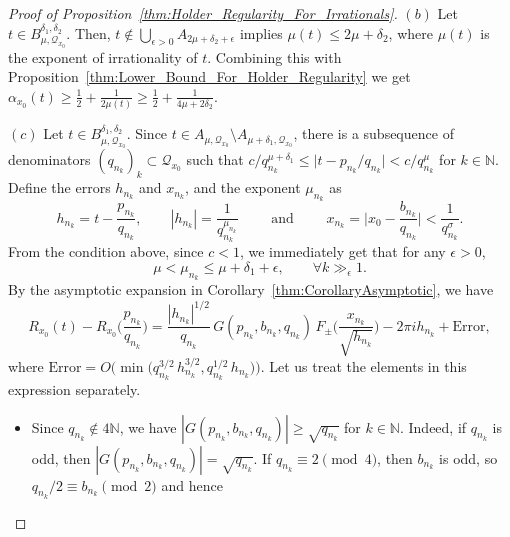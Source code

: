\documentclass[11pt,reqno]{amsart}
\theoremstyle{definition}
\begin{document}
\begin{proof}[Proof of Proposition~\ref{thm:Holder_Regularity_For_Irrationals}]
	


$(b)$ Let $t \in B^{\delta_1, \delta_2}_{\mu, \mathcal Q_{x_0}}$. 
Then,
$t \notin \bigcup_{\epsilon > 0} A_{2\mu + \delta_2 + \epsilon}$ implies $\mu(t) \leq 2\mu + \delta_2$, 
where $\mu(t)$ is the exponent of irrationality of $t$. 
Combining this with Proposition~\ref{thm:Lower_Bound_For_Holder_Regularity} we get
$ \alpha_{x_0}(t) \geq \frac12 + \frac{1}{2\mu(t)} \geq \frac12 + \frac{1}{4\mu + 2\delta_2}$.



$(c)$ Let $t \in B^{\delta_1, \delta_2}_{\mu, \mathcal Q_{x_0}}$. 
Since $t \in  A_{\mu, \mathcal Q_{x_0}} \setminus A_{\mu + \delta_1, \mathcal Q_{x_0} } $, 
there is a subsequence of denominators $(q_{n_k})_k  \subset \mathcal Q_{x_0}$ 
such that $c/q_{n_k}^{\mu + \delta_1} \leq \big|  t - p_{n_k}/q_{n_k} \big| < c/q_{n_k}^\mu$ for $k \in \mathbb N$. 
Define the errors $h_{n_k}$ and $x_{n_k}$, and the exponent $\mu_{n_k}$ as
\begin{equation}\label{eq:Errors_Irrationals}
h_{n_k} =  t - \frac{p_{n_k}}{q_{n_k}}, 
\qquad 
|h_{n_k}| 
= \frac{1}{q_{n_k}^{\mu_{n_k}}}
\qquad  \text{ and } \qquad 
x_{n_k} = \Big| x_0 - \frac{b_{n_k}}{q_{n_k}} \Big| < \frac{1}{q_{n_k}^{\sigma}}. 
\end{equation}
From the condition above, since $c < 1$, 
we immediately get that for any $\epsilon >0$,
\begin{equation}\label{eq:s_n_k_For_Large_k}
\mu < \mu_{n_k} \leq \mu + \delta_1 + \epsilon, \qquad \forall k \gg_\epsilon 1. 
\end{equation}
By the asymptotic expansion in Corollary~\ref{thm:CorollaryAsymptotic}, we have 
\begin{equation}\label{eq:Main_And_Error_Irrationals}
R_{x_0}(t) - R_{x_0}\Big( \frac{p_{n_k}}{q_{n_k}}  \Big) 
= \frac{|h_{n_k}|^{1/2}}{q_{n_k}} \, G(p_{n_k}, b_{n_k}, q_{n_k}) \, F_\pm \Big(  \frac{x_{n_k}}{\sqrt{h_{n_k}}}  \Big) - 2\pi i h_{n_k} 
+ \text{Error},
\end{equation}
where $\text{Error} = O\Big( \min \big( q_{n_k}^{3/2}\, h_{n_k}^{3/2}, q_{n_k}^{1/2} \, h_{n_k} \big) \Big)$. 
Let us treat the elements in this expression separately.
\begin{itemize}
	\item Since $q_{n_k} \not\in 4\mathbb N$, we have $|G(p_{n_k},b_{n_k}, q_{n_k})| \geq \sqrt{q_{n_k}}$ for $k \in \mathbb N$. 
	Indeed, if $q_{n_k}$ is odd, then $|G(p_{n_k},b_{n_k}, q_{n_k})| = \sqrt{q_{n_k}}$.  
	If $q_{n_k} \equiv 2 \pmod{4}$, then $b_{n_k}$ is odd, so $q_{n_k}/2 \equiv b_{n_k} \pmod{2}$ and hence

\end{itemize}
\end{proof}
\end{document}
